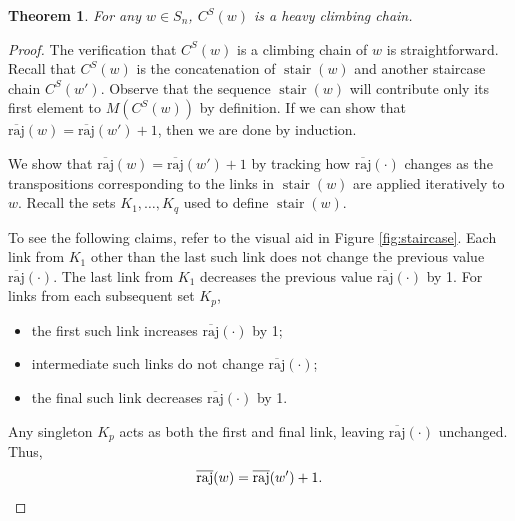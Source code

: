 \documentclass[11pt]{amsart}
\newtheorem{theorem}{Theorem}[section]
\theoremstyle{definition}
\theoremstyle{named}
\newcommand{\CS}{C^S}
\newcommand{\absoverrajcode}[1]{\overline{\mathrm{raj}}(#1)}
\DeclareMathOperator{\stair}{\mathrm{stair}}
\begin{document}
	\begin{theorem}
		\label{thm:staircaseheavy}
		For any $w\in S_n$, $\CS(w)$ is a heavy climbing chain.	
	\end{theorem}
	\begin{proof}
		The verification that $\CS(w)$ is a climbing chain of $w$ is straightforward. 
		Recall that $\CS(w)$ is the concatenation of $\stair(w)$ and another staircase chain $\CS(w')$. 
		Observe that the sequence $\stair(w)$ will contribute only its first element to $M(\CS(w))$ by definition. If we can show that $\absoverrajcode{w}= \absoverrajcode{w'}+1$, then we are done by induction. 
		
		We show that $\absoverrajcode{w}= \absoverrajcode{w'}+1$ by tracking how $\absoverrajcode{\cdot}$ changes as the transpositions corresponding to the links in $\stair(w)$ are applied iteratively to $w$. Recall the sets $K_1,\ldots,K_q$ used to define $\stair(w)$. 
		
		To see the following claims, refer to the visual aid in Figure \ref{fig:staircase}. Each link from $K_1$ other than the last such link does not change the previous value $\absoverrajcode{\cdot}$. The last link from $K_1$ decreases the previous value $\absoverrajcode{\cdot}$ by 1. For links from each subsequent set $K_p$, 
		\begin{itemize}
			\item the first such link increases $\absoverrajcode{\cdot}$ by 1;
			\item intermediate such links do not change $\absoverrajcode{\cdot}$;
			\item the final such link decreases $\absoverrajcode{\cdot}$ by 1.
		\end{itemize}
	Any singleton $K_p$ acts as both the first and final link, leaving $\absoverrajcode{\cdot}$ unchanged. Thus, \[\absoverrajcode{w}= \absoverrajcode{w'}+1.\qedhere\]
	\end{proof}	
\end{document}
